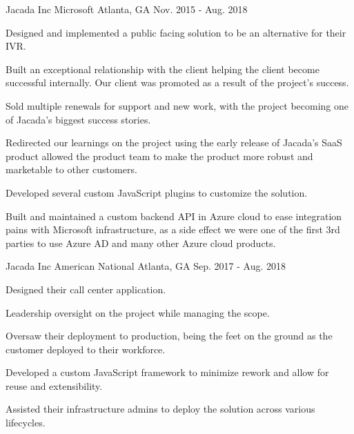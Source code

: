 \begin{cventries}
\cventry
{Jacada Inc} %
{Microsoft} %
{Atlanta, GA} %
{Nov. 2015 - Aug. 2018} %
{
  \begin{cvitems} %
    \item {Designed and implemented a public facing solution to be an alternative for their IVR.}
    \item {Built an exceptional relationship with the client helping the client become successful internally. Our client was promoted as a result of the project's success.}
    \item {Sold multiple renewals for support and new work, with the project becoming one of Jacada’s biggest success stories.}
    \item {Redirected our learnings on the project using the early release of Jacada's SaaS product allowed the product team to make the product more robust and marketable to other customers.}
    \item {Developed several custom JavaScript plugins to customize the solution.}
    \item {Built and maintained a custom backend API in Azure cloud to ease integration pains with Microsoft infrastructure, as a side effect we were one of the first 3rd parties to use Azure AD and many other Azure cloud products.}
  \end{cvitems}
}

\cventry
{Jacada Inc} %
{American National} %
{Atlanta, GA} %
{Sep. 2017 - Aug. 2018} %
{
  \begin{cvitems} %
    \item {Designed their call center application.}
    \item {Leadership oversight on the project while managing the scope.}
    \item {Oversaw their deployment to production, being the feet on the ground as the customer deployed to their workforce.}
    \item {Developed a custom JavaScript framework to minimize rework and allow for reuse and extensibility.}
    \item {Assisted their infrastructure admins to deploy the solution across various lifecycles.}
  \end{cvitems}
}


\end{cventries}

